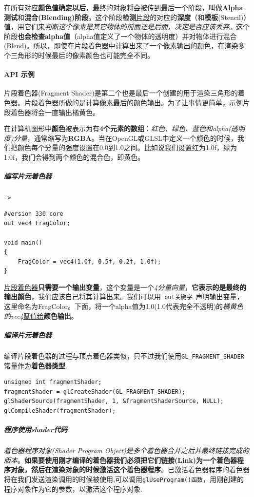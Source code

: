 \documentclass[UTF8,a4paper,12pt]{ctexbook}
\begin{document}
				在所有对应\textbf{颜色值确定以后}，最终的对象将会被传到最后一个阶段，叫做\textbf{Alpha测试}和\textbf{混合(Blending)阶段}。这个阶段\textbf{检测}\underline{片段}的对应的\textbf{深度}（和\textbf{模板}(Stencil)）值，用它们来\textit{判断这个像素是其它物体的前面还是后面，决定是否应该丢弃}。这个阶段\textbf{也会检查alpha值}（alpha值定义了一个物体的透明度）并对物体进行混合(Blend)。所以，即使在片段着色器中计算出来了一个像素输出的颜色，在渲染多个三角形的时候最后的像素颜色也可能完全不同。
				
			\paragraph{API 示例}
				片段着色器(Fragment Shader)是第二个也是最后一个创建的用于渲染三角形的着色器。片段着色器所做的是计算像素最后的颜色输出。为了让事情更简单，示例片段着色器将会一直输出橘黄色。
				
				在计算机图形中\textbf{颜色}被表示为有\textbf{4个元素的数组}：\textit{红色、绿色、蓝色和alpha(透明度)分量}，通常缩写为\textbf{RGBA}。当在OpenGL或GLSL中定义一个颜色的时候，我们把颜色每个分量的强度设置在0.0到1.0之间。比如说我们设置红为1.0f，绿为1.0f，我们会得到两个颜色的混合色，即黄色。
				
				\subparagraph{编写片元着色器}\verb|->|
					\begin{lstlisting}
#version 330 core
out vec4 FragColor;

void main()
{
    FragColor = vec4(1.0f, 0.5f, 0.2f, 1.0f);
} 					
					\end{lstlisting}
				
					\underline{片段着色器}\textbf{只需要一个输出变量}，这个变量是一个\textit{4分量向量}，\textbf{它表示的是最终的输出颜色}，我们应该自己将其计算出来。我们可以用\verb| out关键字 |声明输出变量，这里命名为FragColor。下面，将一个alpha值为1.0(1.0代表完全不透明)的\textit{橘黄色的vec4}\underline{赋值给}\textbf{颜色输出}。					
					
					
				\subparagraph{编译片元着色器}
					编译片段着色器的过程与顶点着色器类似，只不过我们使用\verb|GL_FRAGMENT_SHADER|常量作为\textbf{着色器类型}.
					
					\begin{lstlisting}
unsigned int fragmentShader;
fragmentShader = glCreateShader(GL_FRAGMENT_SHADER);
glShaderSource(fragmentShader, 1, &fragmentShaderSource, NULL);
glCompileShader(fragmentShader);					
					\end{lstlisting}
				
				
				\subparagraph{程序使用shader代码}
					\textit{着色器程序对象(Shader Program Object)}\textit{是多个着色器合并之后并最终链接完成的版本}。\textbf{如果要使用刚才编译的着色器我们必须把它们链接(Link)为一个着色器程序对象，然后在渲染对象的时候激活这个着色器程序}。已激活着色器程序的着色器将在我们发送渲染调用的时候被使用,可以调用\verb|glUseProgram()函数|，用刚创建的程序对象作为它的参数，以激活这个程序对象.
					
\end{document}
